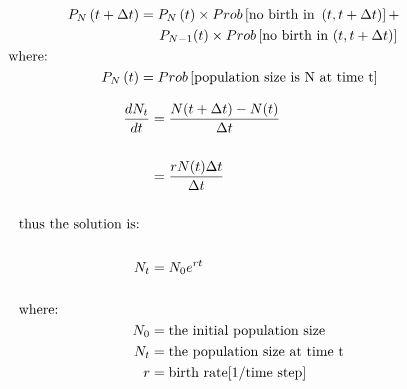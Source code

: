 \documentclass[12pt]{article}
\begin{document}
\begin{align}
P_{N} \left( t + \Delta t \right) & = P_{N} \left( t \right) \times Prob \left[ \text{no birth in } \left( t, t + \Delta t \right) \right]+ \nonumber \\
& \hspace{ 0.2 in} P_{N-1}(t) \times Prob \left[ \text{no birth in } (t, t+\Delta t) \right] \nonumber \\
&    \hspace{-1.3in}  \text{where:} \nonumber \\
P_{N}\left( t \right) & = Prob \left[ \text{population size is N at time t} \right] \nonumber
\end{align} 

\begin{align}
\dfrac{dN_{t}}{dt} & = \frac{N(t+ \Delta t) - N(t)}{\Delta t} \nonumber \\
\nonumber \\
& = \frac{r N(t) \Delta t}{\Delta t} \nonumber \\
\nonumber \\ 
&    \hspace{-1.3in}  \text{thus the solution is:} \nonumber \\
\nonumber \\ 
N_{t} & = N_{0}e^{rt} \nonumber \\
\nonumber \\ 
&    \hspace{-1.3in}  \text{where:} \nonumber \\
N_{0} & = \text{the initial population size} \nonumber \\
N_{t} & = \text{the population size at time t} \nonumber \\
r & = \text{birth rate[1/time step]} \nonumber
\end{align} 
\end{document}
